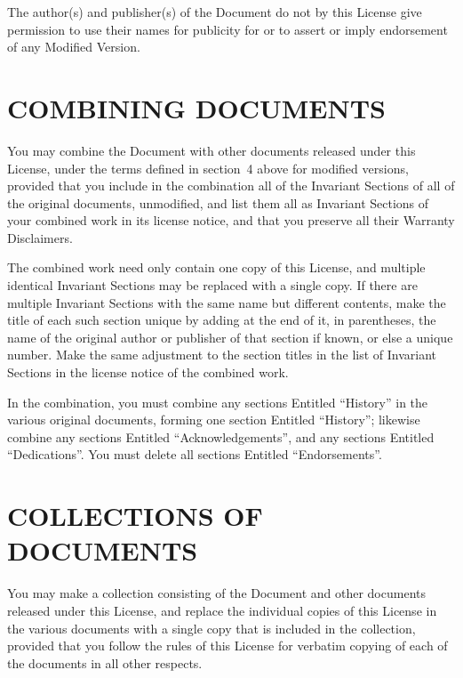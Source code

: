 \documentclass[a4paper,12pt]{book}
\theoremstyle{mes_exemples}	\newtheorem{exemple}[numtho]{Exemple}
\theoremstyle{mes_tho}
\begin{document}
The author(s) and publisher(s) of the Document do not by this License
give permission to use their names for publicity for or to assert or
imply endorsement of any Modified Version.

\section{COMBINING DOCUMENTS}

You may combine the Document with other documents released under this
License, under the terms defined in section~4 above for modified
versions, provided that you include in the combination all of the
Invariant Sections of all of the original documents, unmodified, and
list them all as Invariant Sections of your combined work in its
license notice, and that you preserve all their Warranty Disclaimers.

The combined work need only contain one copy of this License, and
multiple identical Invariant Sections may be replaced with a single
copy.  If there are multiple Invariant Sections with the same name but
different contents, make the title of each such section unique by
adding at the end of it, in parentheses, the name of the original
author or publisher of that section if known, or else a unique number.
Make the same adjustment to the section titles in the list of
Invariant Sections in the license notice of the combined work.

In the combination, you must combine any sections Entitled ``History''
in the various original documents, forming one section Entitled
``History''; likewise combine any sections Entitled ``Acknowledgements'',
and any sections Entitled ``Dedications''.  You must delete all sections
Entitled ``Endorsements''.

\section{COLLECTIONS OF DOCUMENTS}

You may make a collection consisting of the Document and other documents
released under this License, and replace the individual copies of this
License in the various documents with a single copy that is included in
the collection, provided that you follow the rules of this License for
verbatim copying of each of the documents in all other respects.
\end{document}
